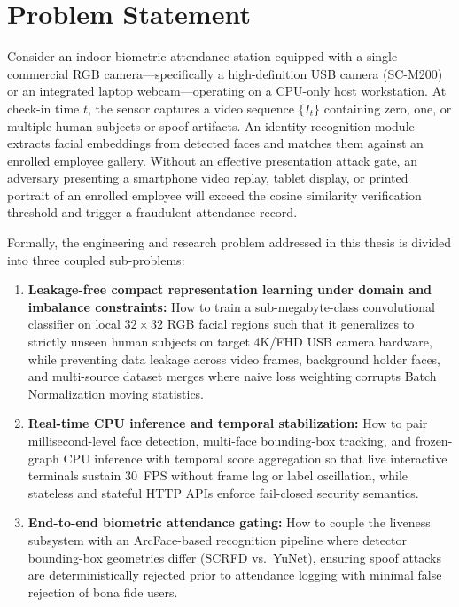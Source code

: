 \section{Problem Statement}
\label{sec:problem_statement}

Consider an indoor biometric attendance station equipped with a single commercial RGB camera---specifically a high-definition USB camera (SC-M200) or an integrated laptop webcam---operating on a CPU-only host workstation. At check-in time $t$, the sensor captures a video sequence $\{I_t\}$ containing zero, one, or multiple human subjects or spoof artifacts. An identity recognition module extracts facial embeddings from detected faces and matches them against an enrolled employee gallery. Without an effective presentation attack gate, an adversary presenting a smartphone video replay, tablet display, or printed portrait of an enrolled employee will exceed the cosine similarity verification threshold and trigger a fraudulent attendance record.

Formally, the engineering and research problem addressed in this thesis is divided into three coupled sub-problems:
\begin{enumerate}
    \item \textbf{Leakage-free compact representation learning under domain and imbalance constraints:} How to train a sub-megabyte-class convolutional classifier on local $32\times32$ RGB facial regions such that it generalizes to strictly unseen human subjects on target 4K/FHD USB camera hardware, while preventing data leakage across video frames, background holder faces, and multi-source dataset merges where naive loss weighting corrupts Batch Normalization moving statistics.
    \item \textbf{Real-time CPU inference and temporal stabilization:} How to pair millisecond-level face detection, multi-face bounding-box tracking, and frozen-graph CPU inference with temporal score aggregation so that live interactive terminals sustain $30$~FPS without frame lag or label oscillation, while stateless and stateful HTTP APIs enforce fail-closed security semantics.
    \item \textbf{End-to-end biometric attendance gating:} How to couple the liveness subsystem with an ArcFace-based recognition pipeline where detector bounding-box geometries differ (SCRFD vs.\ YuNet), ensuring spoof attacks are deterministically rejected prior to attendance logging with minimal false rejection of bona fide users.
\end{enumerate}

